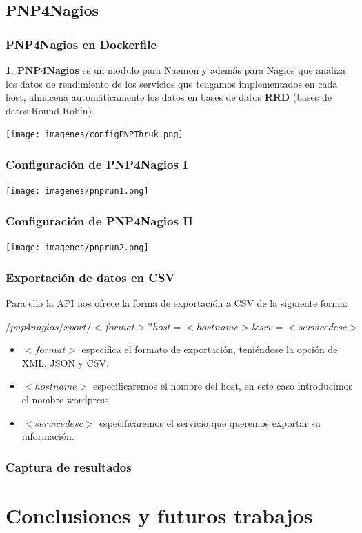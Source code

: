 \documentclass{beamer}
\theoremstyle{plain}
\theoremstyle{definition}
\newtheorem{defn}[thm]{}
\theoremstyle{plain}
\theoremstyle{definition}
\theoremstyle{remark}
\theoremstyle{definition}
\begin{document}
\subsection{PNP4Nagios}

\begin{frame}
	\frametitle{PNP4Nagios en Dockerfile}
	\begin{defn}
		\textbf{PNP4Nagios} es un modulo para Naemon y además para
		Nagios que analiza los datos de rendimiento de los servicios que tengamos implementados en cada host, almacena automáticamente los datos en bases	de datos \textbf{RRD} (bases de datos Round Robin).
	\end{defn}

\centering
\texttt{[image: imagenes/configPNPThruk.png]}
\end{frame}
\begin{frame}
	\frametitle{Configuración de PNP4Nagios I}
	\centering
	\texttt{[image: imagenes/pnprun1.png]}
\end{frame}
\begin{frame}
	\frametitle{Configuración de PNP4Nagios II}
	\centering
	\texttt{[image: imagenes/pnprun2.png]}
\end{frame}
\begin{frame}
	\frametitle{Exportación de datos en CSV}
	Para ello la API nos ofrece la forma de
	exportación a CSV de la siguiente forma:
	
	\textbf{$/pnp4nagios/xport/<format>?host=<hostname>\&srv=<servicedesc>$}
	\begin{itemize} 
	\item \textbf{$<format>$} especifica el formato de exportación, teniéndose la opción de XML, JSON y CSV.
	\item \textbf{$<hostname>$} especificaremos el nombre del host, en este caso introducimos el nombre wordpress.
	\item \textbf{$<servicedesc>$} especificaremos el servicio que queremos exportar su información.
	\end{itemize} 
\end{frame}
\begin{frame}
	\frametitle{Captura de resultados}
\end{frame}


\section{Conclusiones y futuros trabajos}
\end{document}
